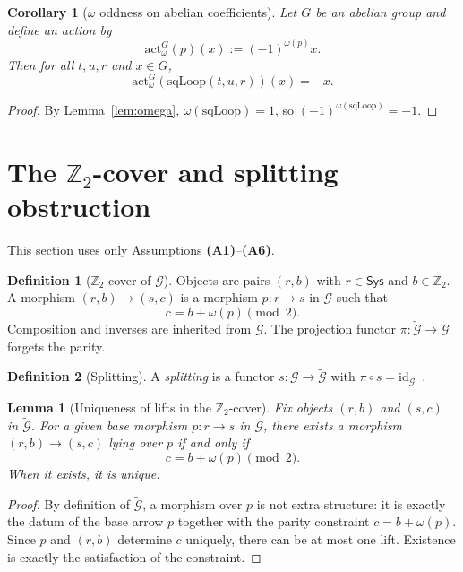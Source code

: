 \documentclass[aps,prl,reprint]{revtex4-2}
\newcommand{\Sys}{\mathsf{Sys}}
\newcommand{\Ztwo}{\mathbb{Z}_2}
\theoremstyle{definition}
\newtheorem{definition}{Definition}[section]
\theoremstyle{plain}
\newtheorem{lemma}{Lemma}[section]
\newtheorem{corollary}{Corollary}[section]
\begin{document}
\begin{corollary}[$\omega$ oddness on abelian coefficients]
\label{cor:omega-odd-abelian}
Let $G$ be an abelian group and define an action by
\[
\mathrm{act}^G_{\omega}(p)(x):=(-1)^{\omega(p)}x.
\]
Then for all $t,u,r$ and $x\in G$,
\[
\mathrm{act}^G_{\omega}(\mathrm{sqLoop}(t,u,r))(x)=-x.
\]

\end{corollary}

\begin{proof}
By Lemma~\ref{lem:omega}, $\omega(\mathrm{sqLoop})=1$, so $(-1)^{\omega(\mathrm{sqLoop})}=-1$.
\end{proof}

\section{The $\Ztwo$-cover and splitting obstruction}
\label{sec:cover}
This section uses only Assumptions \textbf{(A1)}--\textbf{(A6)}.

\begin{definition}[$\Ztwo$-cover of $\mathcal G$]
\label{def:limited-scope-theorem-translation-clean-004}
Objects are pairs $(r,b)$ with $r\in\Sys$ and $b\in\Ztwo$. A morphism
$(r,b)\to(s,c)$ is a morphism $p:r\to s$ in $\mathcal G$ such that
\[c=b+\omega(p)\pmod 2.\]
Composition and inverses are inherited from $\mathcal G$. The projection functor
$\pi:\widetilde{\mathcal G}\to\mathcal G$ forgets the parity.

\end{definition}

\begin{definition}[Splitting]
A \emph{splitting} is a functor $s:\mathcal G\to\widetilde{\mathcal G}$ with
$\pi\circ s=\mathrm{id}_{\mathcal G}$~\cite{Brown2006TopologyGroupoids}.

\end{definition}

\begin{lemma}[Uniqueness of lifts in the $\Ztwo$-cover]
\label{lem:unique-lift}
Fix objects $(r,b)$ and $(s,c)$ in $\widetilde{\mathcal G}$.
For a given base morphism $p:r\to s$ in $\mathcal G$, there exists a morphism
$(r,b)\to(s,c)$ lying over $p$ if and only if
\[
c=b+\omega(p)\pmod 2.
\]
When it exists, it is unique.

\end{lemma}

\begin{proof}
By definition of $\widetilde{\mathcal G}$, a morphism over $p$ is not extra
structure: it is exactly the datum of the base arrow $p$ together with the
parity constraint $c=b+\omega(p)$. Since $p$ and $(r,b)$ determine $c$ uniquely,
there can be at most one lift. Existence is exactly the satisfaction of the
constraint.
\end{proof}
\end{document}
